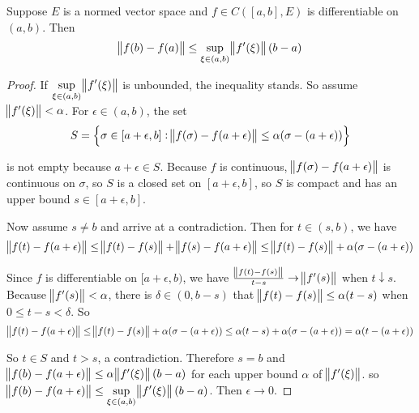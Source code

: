 \begin{theorem}
    Suppose $E$ is a normed vector space and $f \in C([a,b], E)$ is differentiable on $(a,b)$. Then
    \begin{equation}
        \norm{f(b) - f(a)} \leq \sup_{\xi \in (a,b)} \norm{f'(\xi)}(b-a)
    \end{equation}
\end{theorem}
\begin{proof}
    If $\displaystyle \sup_{\xi \in (a,b)} \norm{f'(\xi)}$ is unbounded, the inequality stands. So assume $\norm{f'(\xi)} < \alpha$. For $\epsilon \in (a,b)$, the set
    \begin{equation*}
        S = \set{\sigma \in [a+\epsilon, b]: \norm{f(\sigma) - f(a + \epsilon)} \leq \alpha (\sigma - (a + \epsilon))}
    \end{equation*}
    
    is not empty because $a + \epsilon \in S$. Because $f$ is continuous, $\norm{f(\sigma) - f(a + \epsilon)}$ is continuous on $\sigma$, so $S$ is a closed set on $[a+\epsilon, b]$, so $S$ is compact and has an upper bound $s \in [a+\epsilon,b]$.
    
    Now assume $s \neq b$ and arrive at a contradiction. Then for $t \in (s,b)$, we have
    \begin{equation}
        \norm{f(t) - f(a+\epsilon)} \leq \norm{f(t) - f(s)} + \norm{f(s) - f(a + \epsilon)} \leq \norm{f(t) - f(s)} + \alpha (\sigma - (a + \epsilon))
    \end{equation}
    
    Since $f$ is differentiable on $[a+\epsilon, b)$, we have $\frac{\norm{f(t) -f(s)}}{t-s} \rightarrow \norm{f'(s)}$ when $t \downarrow s$. Because $\norm{f'(s)} < \alpha$, there is $\delta \in (0, b-s)$ that $\norm{f(t) - f(s)} \leq \alpha(t-s)$ when $0 \leq t-s < \delta$. So 
    \begin{equation*}
        \norm{f(t) - f(a+\epsilon)} \leq \norm{f(t) - f(s)} + \alpha (\sigma - (a + \epsilon)) \leq \alpha(t-s) + \alpha (\sigma - (a + \epsilon)) = \alpha(t - (a + \epsilon))
    \end{equation*}
    
    So $t \in S$ and $t > s$, a contradiction. Therefore $s = b$ and $\norm{f(b) - f(a+\epsilon)} \leq \alpha \norm{f'(\xi)}(b-a)$ for each upper bound $\alpha$ of $\norm{f'(\xi)}$. so $\displaystyle \norm{f(b) - f(a+\epsilon)} \leq \sup_{\xi \in (a,b)} \norm{f'(\xi)}(b-a)$. Then $\epsilon \rightarrow 0$.
\end{proof}

